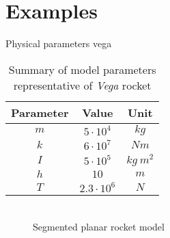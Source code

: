 \documentclass{mbd_fullpaper}
\begin{document}
\section{Examples}

Physical parameters vega
\renewcommand{\arraystretch}{1.5}
\begin{table}[!ht]
  \begin{center}
    \caption{Summary of model parameters representative of \emph{Vega} rocket \label{tab:modelparam}}
    \vspace{1mm}
    \begin{tabular}{ ccc }
	\hline
           Parameter & Value & Unit \\
	\hline
      	$m$ & $5 \cdot 10^4$ & $kg$\\
      	$k$ & $6 \cdot 10^7$ & $Nm$\\
      	$I$ & $5 \cdot 10^5$ & $kg~m^2$\\
      	$h$ & $10$ & $m$\\
      	$T$ & $2.3 \cdot 10^6$ & $N$\\
    \end{tabular}
    \label{tab:tab1}
  \end{center}
\end{table}
%
\begin{multline}

\end{multline}
\begin{equation}

\end{equation}
%

\begin{figure}[h]
  \begin{center}
    
    \caption{Segmented planar rocket model \label{fig:rocket-model}}
  \end{center}
\end{figure}
\end{document}
